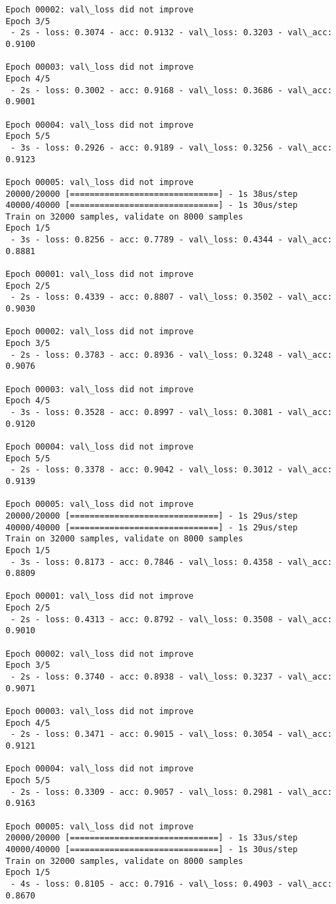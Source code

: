 \documentclass[11pt]{article}
\begin{document}
\begin{Verbatim}[commandchars=\\\{\}]
Epoch 00002: val\_loss did not improve
Epoch 3/5
 - 2s - loss: 0.3074 - acc: 0.9132 - val\_loss: 0.3203 - val\_acc: 0.9100

Epoch 00003: val\_loss did not improve
Epoch 4/5
 - 2s - loss: 0.3002 - acc: 0.9168 - val\_loss: 0.3686 - val\_acc: 0.9001

Epoch 00004: val\_loss did not improve
Epoch 5/5
 - 3s - loss: 0.2926 - acc: 0.9189 - val\_loss: 0.3256 - val\_acc: 0.9123

Epoch 00005: val\_loss did not improve
20000/20000 [==============================] - 1s 38us/step
40000/40000 [==============================] - 1s 30us/step
Train on 32000 samples, validate on 8000 samples
Epoch 1/5
 - 3s - loss: 0.8256 - acc: 0.7789 - val\_loss: 0.4344 - val\_acc: 0.8881

Epoch 00001: val\_loss did not improve
Epoch 2/5
 - 2s - loss: 0.4339 - acc: 0.8807 - val\_loss: 0.3502 - val\_acc: 0.9030

Epoch 00002: val\_loss did not improve
Epoch 3/5
 - 2s - loss: 0.3783 - acc: 0.8936 - val\_loss: 0.3248 - val\_acc: 0.9076

Epoch 00003: val\_loss did not improve
Epoch 4/5
 - 3s - loss: 0.3528 - acc: 0.8997 - val\_loss: 0.3081 - val\_acc: 0.9120

Epoch 00004: val\_loss did not improve
Epoch 5/5
 - 2s - loss: 0.3378 - acc: 0.9042 - val\_loss: 0.3012 - val\_acc: 0.9139

Epoch 00005: val\_loss did not improve
20000/20000 [==============================] - 1s 29us/step
40000/40000 [==============================] - 1s 29us/step
Train on 32000 samples, validate on 8000 samples
Epoch 1/5
 - 3s - loss: 0.8173 - acc: 0.7846 - val\_loss: 0.4358 - val\_acc: 0.8809

Epoch 00001: val\_loss did not improve
Epoch 2/5
 - 2s - loss: 0.4313 - acc: 0.8792 - val\_loss: 0.3508 - val\_acc: 0.9010

Epoch 00002: val\_loss did not improve
Epoch 3/5
 - 2s - loss: 0.3740 - acc: 0.8938 - val\_loss: 0.3237 - val\_acc: 0.9071

Epoch 00003: val\_loss did not improve
Epoch 4/5
 - 2s - loss: 0.3471 - acc: 0.9015 - val\_loss: 0.3054 - val\_acc: 0.9121

Epoch 00004: val\_loss did not improve
Epoch 5/5
 - 2s - loss: 0.3309 - acc: 0.9057 - val\_loss: 0.2981 - val\_acc: 0.9163

Epoch 00005: val\_loss did not improve
20000/20000 [==============================] - 1s 33us/step
40000/40000 [==============================] - 1s 30us/step
Train on 32000 samples, validate on 8000 samples
Epoch 1/5
 - 4s - loss: 0.8105 - acc: 0.7916 - val\_loss: 0.4903 - val\_acc: 0.8670


\end{Verbatim}
\end{document}
